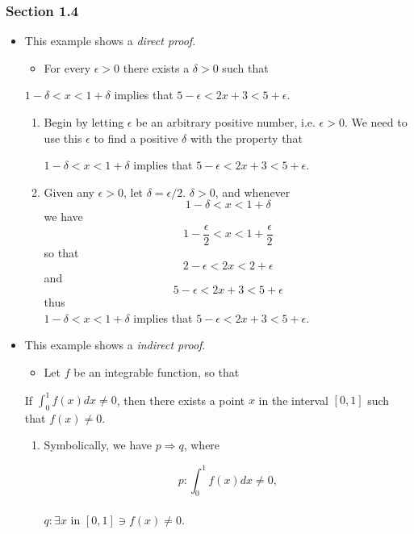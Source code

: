 \documentclass[12pt]{article}
\begin{document}
\subsubsection{Section 1.4}
\label{sec:org0438e66}
\begin{itemize}
\item This example shows a \emph{direct proof}.
\begin{itemize}
\item For every \(\epsilon>0\) there exists a \(\delta>0\) such that
\end{itemize}
\begin{center}
\(1-\delta<x<1+\delta\) implies that \(5-\epsilon<2x+3<5+\epsilon\).
\end{center}

\begin{enumerate}
\item Begin by letting \(\epsilon\) be an arbitrary positive number, i.e. \(\epsilon>0\). We need to
use this \(\epsilon\) to find a positive \(\delta\) with the property that
\begin{center}
\(1-\delta<x<1+\delta\) implies that \(5-\epsilon<2x+3<5+\epsilon\).
\end{center}
\item Given any \(\epsilon>0\), let \(\delta=\epsilon/2\). \(\delta>0\), and whenever
$$1-\delta<x<1+\delta$$
we have $$1-\frac{\epsilon}{2}<x<1+\frac{\epsilon}{2}$$
so that $$2-\epsilon<2x<2+\epsilon$$
and $$5-\epsilon<2x+3<5+\epsilon$$
thus \\ 
\center $1-\delta<x<1+\delta$ implies that $5-\epsilon<2x+3<5+\epsilon$.
\end{enumerate}
\item This example shows a \emph{indirect proof}.
\begin{itemize}
\item Let \(f\) be an integrable function, so that
\end{itemize}
\begin{center}
If \(\int_{0}^{1}f(x)dx\neq0\), then there exists a point \(x\) in the interval \([0,1]\) such
that \(f(x)\neq0\).
\end{center}

\begin{enumerate}
\item Symbolically, we have \(p\Rightarrow{}q\), where
\begin{center}
$$p: \int_{0}^{1}f(x)dx\neq0,$$ \\
\(q: \exists{}x\) in \([0,1]\ni{}f(x)\neq0\).
\end{center}


\end{enumerate}
\end{itemize}
\end{document}
